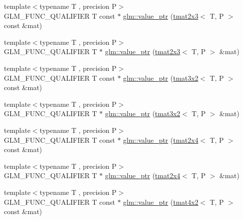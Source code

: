 \begin{DoxyCompactItemize}
{\footnotesize template$<$typename T , precision P$>$ }\\G\+L\+M\+\_\+\+F\+U\+N\+C\+\_\+\+Q\+U\+A\+L\+I\+F\+I\+ER T const  $\ast$ \hyperlink{group__gtc__type__ptr_ga968f2c8899914ea1c1daaaded8daa6b5}{glm\+::value\+\_\+ptr} (\hyperlink{structglm_1_1tmat2x3}{tmat2x3}$<$ T, P $>$ const \&mat)
\item 
{\footnotesize template$<$typename T , precision P$>$ }\\G\+L\+M\+\_\+\+F\+U\+N\+C\+\_\+\+Q\+U\+A\+L\+I\+F\+I\+ER T $\ast$ \hyperlink{group__gtc__type__ptr_ga36fb9a17664c8b6848a5d005e4068a2f}{glm\+::value\+\_\+ptr} (\hyperlink{structglm_1_1tmat2x3}{tmat2x3}$<$ T, P $>$ \&mat)
\item 
{\footnotesize template$<$typename T , precision P$>$ }\\G\+L\+M\+\_\+\+F\+U\+N\+C\+\_\+\+Q\+U\+A\+L\+I\+F\+I\+ER T const  $\ast$ \hyperlink{group__gtc__type__ptr_ga398202d6ce304deb7da50badde85ee41}{glm\+::value\+\_\+ptr} (\hyperlink{structglm_1_1tmat3x2}{tmat3x2}$<$ T, P $>$ const \&mat)
\item 
{\footnotesize template$<$typename T , precision P$>$ }\\G\+L\+M\+\_\+\+F\+U\+N\+C\+\_\+\+Q\+U\+A\+L\+I\+F\+I\+ER T $\ast$ \hyperlink{group__gtc__type__ptr_gad6a737f57febdef255873f6a44d0db0e}{glm\+::value\+\_\+ptr} (\hyperlink{structglm_1_1tmat3x2}{tmat3x2}$<$ T, P $>$ \&mat)
\item 
{\footnotesize template$<$typename T , precision P$>$ }\\G\+L\+M\+\_\+\+F\+U\+N\+C\+\_\+\+Q\+U\+A\+L\+I\+F\+I\+ER T const  $\ast$ \hyperlink{group__gtc__type__ptr_ga2336cd68e72b0d295c8cd33eb1588480}{glm\+::value\+\_\+ptr} (\hyperlink{structglm_1_1tmat2x4}{tmat2x4}$<$ T, P $>$ const \&mat)
\item 
{\footnotesize template$<$typename T , precision P$>$ }\\G\+L\+M\+\_\+\+F\+U\+N\+C\+\_\+\+Q\+U\+A\+L\+I\+F\+I\+ER T $\ast$ \hyperlink{group__gtc__type__ptr_ga0d745a55255710933effd6391307f681}{glm\+::value\+\_\+ptr} (\hyperlink{structglm_1_1tmat2x4}{tmat2x4}$<$ T, P $>$ \&mat)
\item 
{\footnotesize template$<$typename T , precision P$>$ }\\G\+L\+M\+\_\+\+F\+U\+N\+C\+\_\+\+Q\+U\+A\+L\+I\+F\+I\+ER T const  $\ast$ \hyperlink{group__gtc__type__ptr_ga1de002422f32c6da9d65d3f257f37196}{glm\+::value\+\_\+ptr} (\hyperlink{structglm_1_1tmat4x2}{tmat4x2}$<$ T, P $>$ const \&mat)
\item 

\end{DoxyCompactItemize}
